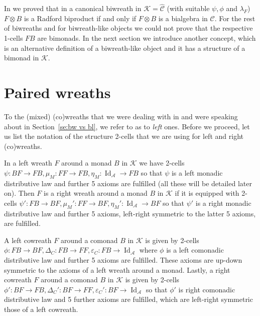 \documentclass[a4paper, 12pt]{article}
\renewcommand{\_}[1]{\mbox{$_{\left( #1 \right)}$}}
\theoremstyle{plain}
\newcommand{\ot}{\otimes}
\newcommand{\C}{{\mathcal C}}
\newcommand{\A}{{\mathcal A}}
\newcommand{\Id}{\operatorname {Id}}
\newcommand{\Epsilon}{\varepsilon}
\def\K{{\mathcal K}}  %
\newcommand{\selabel}[1]{\label{se:#1}}
\newcommand{\seref}[1]{Section~\ref{se:#1}}
\begin{document}
In \cite[Theorem 5.3]{Femic5} we proved that in a canonical biwreath in $\K=\hat\C$ (with suitable $\psi, \phi$ and $\lambda_F$) $F\ot B$ is a Radford biproduct 
if and only if $F\ot B$ is a bialgebra in $\C$. For the rest of biwreaths and for biwreath-like objects we could not prove that the respective 1-cells $FB$ are bimonads. 
In the next section we introduce another concept, which is an alternative definition of a biwreath-like object and it has a structure of a bimonad in $\K$. 



\section{Paired wreaths}  \selabel{Paired}



To the (mixed) (co)wreaths that we were dealing with in \cite{Femic5} and were speaking about in \seref{bw vs bl}, we refer to as to {\em left} ones. 
Before we proceed, let us list the notation of the structure 2-cells that we are using for left and right (co)wreaths. 

\medskip

In a left wreath $F$ around a monad $B$ in $\K$ we have 2-cells $\psi: BF\to FB, \mu_M:FF\to FB, \eta_M:\Id_{\A}\to FB$ so that $\psi$ is a left monadic distributive law and 
further 5 axioms are fulfilled (all these will be detailed later on). Then $F$ is a right wreath around a monad $B$ in $\K$ if it is equipped with 2-cells 
$\psi': FB\to BF, \mu_M':FF\to BF, \eta_M':\Id_{\A}\to BF$ so that $\psi'$ is a right monadic distributive law and further 5 axioms, left-right symmetric to the latter 5 axioms, are fulfilled. 

A left cowreath $F$ around a comonad $B$ in $\K$ is given by 2-cells $\phi: FB\to BF, \Delta_C: FB\to FF, \Epsilon_C: FB\to\Id_{\A}$ where $\phi$ is a left comonadic 
distributive law and further 5 axioms are fulfilled. These axioms are up-down symmetric to the axioms of a left wreath around a monad. Lastly, a right 
cowreath $F$ around a comonad $B$ in $\K$ is given by 2-cells $\phi': BF\to FB, \Delta_C': BF\to FF, \Epsilon_C': BF\to\Id_{\A}$ so that $\phi'$ is right comonadic distributive law 
and 5 further axioms are fulfilled, which are left-right symmetric those of a left cowreath. 

\medskip
\end{document}
